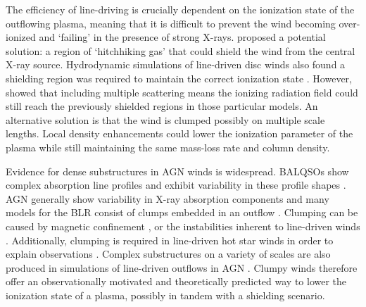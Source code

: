 \documentclass[preprint, a4paper, 11pt]{aastex}
\begin{document}
The efficiency of line-driving is crucially dependent on the ionization state 
of the outflowing plasma, meaning that it is difficult to prevent 
the wind becoming over-ionized and `failing' in the presence of strong X-rays. 
\cite{MCGV95} proposed a potential solution: 
a region of `hitchhiking gas' that could shield the wind from the central X-ray source. 
Hydrodynamic simulations of line-driven disc winds also found a shielding region
was required to maintain the correct ionization state \citep{PSK2000,PK04}. 
However, \cite{H14} showed that including multiple scattering means the ionizing radiation 
field could still reach the previously shielded regions in those particular models.
An alternative solution is that the wind is clumped \citep[e.g.][]{hamann2013}
possibly on multiple scale lengths. Local density enhancements could lower the 
ionization parameter of the plasma while still maintaining the same mass-loss 
rate and column density. 


Evidence for dense substructures in AGN winds is widespread.
BALQSOs show complex absorption line profiles \citep{ganguly2006, simonhamann2010}
and exhibit variability in these profile shapes \citep{capellupo2011,capellupo2012,capellupo2014}.
AGN generally show variability in X-ray absorption components \citep[e.g.][]{risaliti2002}
and many models for the BLR consist of clumps embedded in an outflow 
\citep{krolik1981, emmering1992, dekool1995, cassidyraine1996}.
Clumping can be caused by magnetic confinement \cite{dekool1995},
or the instabilities inherent to line-driven winds 
\citep{lucysolomon1970,macgregor1979,carlberg1980,owockirybicki1984,owockirybicki1985}.
Additionally, clumping is required in line-driven hot star winds 
in order to explain observations \citep{hillier1991eswingsmodel}. Complex substructures 
on a variety of scales are also produced in simulations of line-driven 
outflows in AGN \citep{PSK2000,PK04,progakurosawa2010,proga2014}.
Clumpy winds therefore offer an observationally motivated and theoretically 
predicted way to lower the ionization state of a plasma, possibly in tandem
with a shielding scenario. 




\end{document}
